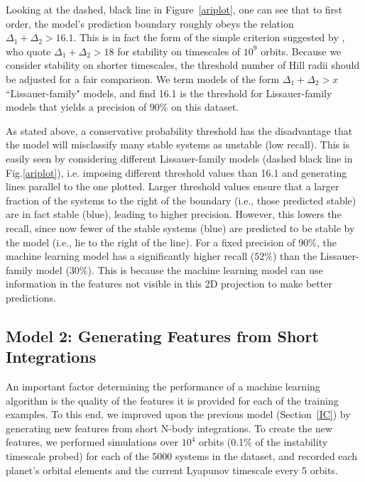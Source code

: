 Looking at the dashed, black line in Figure~\ref{ariplot}, one can see that to first order, the model's prediction boundary roughly obeys the relation $\Delta_1 + \Delta_2 > 16.1$.
This is in fact the form of the simple criterion suggested by \cite{Lissauer11}, who quote $\Delta_1 + \Delta_2 > 18$ for stability on timescales of $10^9$ orbits. 
Because we consider stability on shorter timescales, the threshold number of Hill radii should be adjusted for a fair comparison.
We term models of the form $\Delta_1 + \Delta_2 > x$ ``Lissauer-family" models, and find 16.1 is the threshold for Lissauer-family models that yields a precision of 90\% on this dataset.

As stated above, a conservative probability threshold has the disadvantage that the model will misclassify many stable systems as unstable (low recall).  
This is easily seen by considering different Lissauer-family models (dashed black line in Fig.\:\ref{ariplot}), i.e. imposing different threshold values than 16.1 and generating lines parallel to the one plotted.
Larger threshold values ensure that a larger fraction of the systems to the right of the boundary (i.e., those predicted stable) are in fact stable (blue), leading to higher precision.
However, this lowers the recall, since now fewer of the stable systems (blue) are predicted to be stable by the model (i.e., lie to the right of the line).
For a fixed precision of 90\%, the machine learning model has a significantly higher recall ($52\%$) than the Lissauer-family model ($30\%$). 
This is because the machine learning model can use information in the features not visible in this 2D projection to make better predictions.


\subsection{Model 2: Generating Features from Short Integrations} \label{shortintegrations}

An important factor determining the performance of a machine learning algorithm is the quality of the features it is provided for each of the training examples.
To this end, we improved upon the previous model (Section~\ref{IC}) by generating new features from short N-body integrations.
To create the new features, we performed simulations over $10^4$ orbits (0.1\% of the instability timescale probed) for each of the 5000 systems in the dataset, and recorded each planet's orbital elements and the current Lyapunov timescale every 5 orbits.

